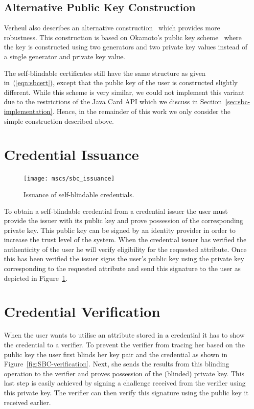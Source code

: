 \subsection{Alternative Public Key Construction}

Verheul also describes an alternative construction~\cite{Verheul01} which 
provides more robustness. This construction is based on Okamoto's public key
scheme~\cite{Okamoto1993} where the key is constructed using two generators and
two private key values instead of a single generator and private key value.

The self-blindable certificates still have the same structure as given 
in~(\ref{eqn:sbcert}), except that the public key of the user is constructed 
slightly different. While this scheme is very similar, we could not implement 
this variant due to the restrictions of the Java Card API which we discuss in 
Section~\ref{sec:sbc-implementation}. Hence, in the remainder of this work we 
only consider the simple construction described above.

\section{Credential Issuance}

\begin{figure}[t]
  \centering
  \texttt{[image: mscs/sbc\_issuance]}
  \caption{Issuance of self-blindable credentials.}
  \label{fig:SBC-issuance}
\end{figure}

To obtain a self-blindable credential from a credential issuer the user must
provide the issuer with its public key and prove possession of the corresponding
private key. This public key can be signed by an identity provider in order to
increase the trust level of the system. When the credential issuer has verified
the authenticity of the user he will verify eligibility for the requested
attribute. Once this has been verified the issuer signs the user's public key
using the private key corresponding to the requested attribute and send this
signature to the user as depicted in Figure~\ref{fig:SBC-issuance}.

\section{Credential Verification}

When the user wants to utilise an attribute stored in a credential it has to
show the credential to a verifier. To prevent the verifier from tracing her
based on the public key the user first blinds her key pair and the credential as
shown in Figure~\ref{fig:SBC-verification}. Next, she sends the results from
this blinding operation to the verifier and proves possession of the (blinded)
private key. This last step is easily achieved by signing a challenge received
from the verifier using this private key. The verifier can then verify this
signature using the public key it received earlier.

